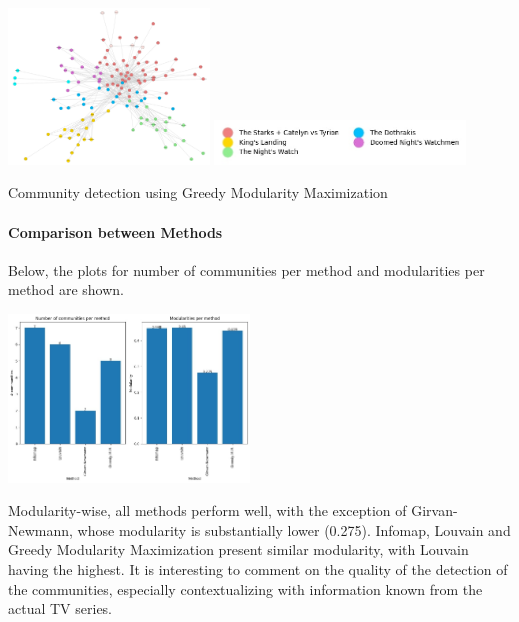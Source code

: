 \documentclass[10pt,twocolumn,letterpaper]{article}
\begin{document}
\begin{center}
    \includegraphics[width=0.4\textwidth]{img/s1/communities_infomap.jpg}
    \includegraphics[width=0.5\textwidth]{img/s1/gmm_legend.jpg}
    \caption{\small{Community detection using Greedy Modularity Maximization}}
\end{center}


\paragraph{Comparison between Methods}

Below, the plots for number of communities per method and modularities per method are shown. 

\begin{center}
    \includegraphics[width=0.48\textwidth]{img/s1/community_comparison.jpg}
\end{center}

Modularity-wise, all methods perform well, with the exception of Girvan-Newmann, whose modularity is substantially lower (0.275). Infomap, Louvain and Greedy Modularity Maximization present similar modularity, with Louvain having the highest. 
It is interesting to comment on the quality of the detection of the communities, especially contextualizing with information known from the actual TV series. 
\end{document}
